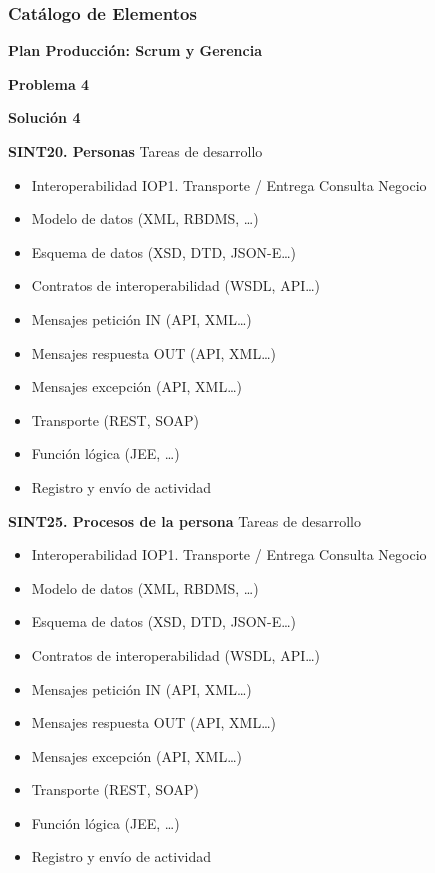\documentclass[
  paper=a4,
  ,captions=tableheading
]{scrartcl}
\providecommand{\tightlist}{%
  \setlength{\itemsep}{0pt}\setlength{\parskip}{0pt}}
\begin{document}
\subsubsection{Catálogo de
Elementos}\label{sec:catuxe1logo-de-elementos-7}

\textbf{Plan Producción: Scrum y Gerencia}

\textbf{Problema 4}

\textbf{Solución 4}

\textbf{SINT20. Personas} Tareas de desarrollo

\begin{itemize}
\tightlist
\item
  Interoperabilidad IOP1. Transporte / Entrega Consulta Negocio
\item
  Modelo de datos (XML, RBDMS, \ldots)
\item
  Esquema de datos (XSD, DTD, JSON-E\ldots)
\item
  Contratos de interoperabilidad (WSDL, API\ldots)
\item
  Mensajes petición IN (API, XML\ldots)
\item
  Mensajes respuesta OUT (API, XML\ldots)
\item
  Mensajes excepción (API, XML\ldots)
\item
  Transporte (REST, SOAP)
\item
  Función lógica (JEE, \ldots)
\item
  Registro y envío de actividad
\end{itemize}

\textbf{SINT25. Procesos de la persona} Tareas de desarrollo

\begin{itemize}
\tightlist
\item
  Interoperabilidad IOP1. Transporte / Entrega Consulta Negocio
\item
  Modelo de datos (XML, RBDMS, \ldots)
\item
  Esquema de datos (XSD, DTD, JSON-E\ldots)
\item
  Contratos de interoperabilidad (WSDL, API\ldots)
\item
  Mensajes petición IN (API, XML\ldots)
\item
  Mensajes respuesta OUT (API, XML\ldots)
\item
  Mensajes excepción (API, XML\ldots)
\item
  Transporte (REST, SOAP)
\item
  Función lógica (JEE, \ldots)
\item
  Registro y envío de actividad
\end{itemize}
\end{document}

